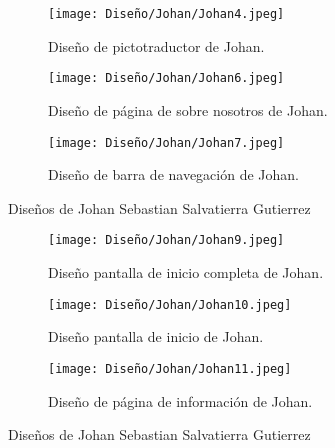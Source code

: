 \begin{figure}[ht!]
  \ContinuedFloat
  \begin{subfigure}{\textwidth}
    \centering
    \texttt{[image: Diseño/Johan/Johan4.jpeg]}
    \caption{Diseño de pictotraductor de Johan.}
    \label{Johan4}
  \end{subfigure}

  \begin{subfigure}{\textwidth}
    \centering
    \texttt{[image: Diseño/Johan/Johan6.jpeg]}
    \caption{Diseño de página de sobre nosotros de Johan.}
    \label{Johan6}
  \end{subfigure}

  \begin{subfigure}{\textwidth}
    \centering
    \texttt{[image: Diseño/Johan/Johan7.jpeg]}
    \caption{Diseño de barra de navegación de Johan.}
    \label{Johan7}
  \end{subfigure}

  \caption{Diseños de Johan Sebastian Salvatierra Gutierrez}
  \label{fig:disenyoJohan}
\end{figure}

\begin{figure}[ht!]
  \ContinuedFloat
  \begin{subfigure}{\textwidth}
    \centering
    \texttt{[image: Diseño/Johan/Johan9.jpeg]}
    \caption{Diseño pantalla de inicio completa de Johan.}
    \label{Johan9}
  \end{subfigure}

  \begin{subfigure}{\textwidth}
    \centering
    \texttt{[image: Diseño/Johan/Johan10.jpeg]}
    \caption{Diseño pantalla de inicio de Johan.}
    \label{Johan10}
  \end{subfigure}

  \begin{subfigure}{\textwidth}
    \centering
    \texttt{[image: Diseño/Johan/Johan11.jpeg]}
    \caption{Diseño de página de información de Johan.}
    \label{Johan11}
  \end{subfigure}

  \caption{Diseños de Johan Sebastian Salvatierra Gutierrez}
  \label{fig:disenyoJohan}
\end{figure}